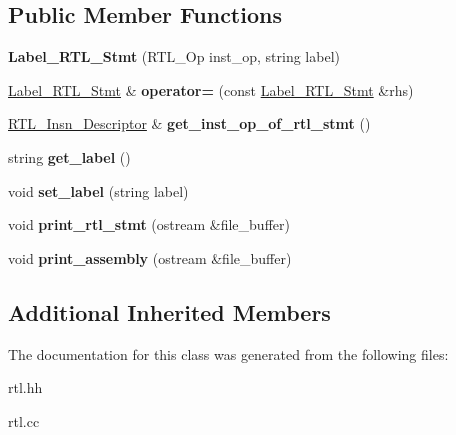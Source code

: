 \subsection*{Public Member Functions}
\begin{DoxyCompactItemize}
\item 
\mbox{\label{classLabel__RTL__Stmt_a3bb3e6a69c02ef280a7fb1be348d1888}} 
{\bfseries Label\+\_\+\+R\+T\+L\+\_\+\+Stmt} (R\+T\+L\+\_\+\+Op inst\+\_\+op, string label)
\item 
\mbox{\label{classLabel__RTL__Stmt_ac83ad285453c7a6d935a9520af63c745}} 
\hyperlink{classLabel__RTL__Stmt}{Label\+\_\+\+R\+T\+L\+\_\+\+Stmt} \& {\bfseries operator=} (const \hyperlink{classLabel__RTL__Stmt}{Label\+\_\+\+R\+T\+L\+\_\+\+Stmt} \&rhs)
\item 
\mbox{\label{classLabel__RTL__Stmt_ac6cee1f92471f467af10c7b2e53e9b57}} 
\hyperlink{classRTL__Insn__Descriptor}{R\+T\+L\+\_\+\+Insn\+\_\+\+Descriptor} \& {\bfseries get\+\_\+inst\+\_\+op\+\_\+of\+\_\+rtl\+\_\+stmt} ()
\item 
\mbox{\label{classLabel__RTL__Stmt_a8a9e8c2ac0ee6acbf785bce0e9e705d6}} 
string {\bfseries get\+\_\+label} ()
\item 
\mbox{\label{classLabel__RTL__Stmt_a02068853cef52d7410a6b6ef7da68a8f}} 
void {\bfseries set\+\_\+label} (string label)
\item 
\mbox{\label{classLabel__RTL__Stmt_ac000444da441431d5f19bc2ddff2b1ef}} 
void {\bfseries print\+\_\+rtl\+\_\+stmt} (ostream \&file\+\_\+buffer)
\item 
\mbox{\label{classLabel__RTL__Stmt_ad71cba0745bfc084c0078b62ea6bd7bf}} 
void {\bfseries print\+\_\+assembly} (ostream \&file\+\_\+buffer)
\end{DoxyCompactItemize}
\subsection*{Additional Inherited Members}


The documentation for this class was generated from the following files\+:\begin{DoxyCompactItemize}
\item 
rtl.\+hh\item 
rtl.\+cc\end{DoxyCompactItemize}
